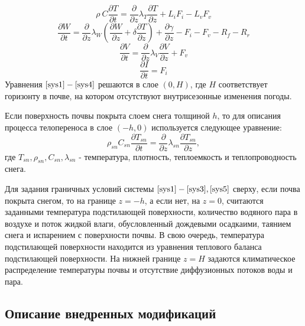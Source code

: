 \documentclass[a4paper, fontsize=14pt]{scrartcl}
\begin{document}
\begin{equation}
    \rho ~ C \dfrac{\partial T}{\partial t} = \dfrac{\partial }{\partial z} \lambda_T \dfrac{\partial T}{\partial z} + L_i F_i - L_v F_v  \label{sys1}
\end{equation}
\begin{equation}
    \dfrac{\partial W}{\partial t} = \dfrac{\partial }{\partial z} \lambda_W \left( \dfrac{\partial W}{\partial z} + \delta \dfrac{\partial T}{\partial z} \right) + \dfrac{\partial \gamma}{\partial z} - F_i - F_v - R_f - R_r  \label{sys2}
\end{equation}
\begin{equation}
    \dfrac{\partial V}{\partial t} = \dfrac{\partial }{\partial z} \lambda_V \dfrac{\partial V}{\partial z} + F_v  \label{sys3}
\end{equation}
\begin{equation}
    \dfrac{\partial I}{\partial t} = F_i  \label{sys4}
\end{equation}
Уравнения $\eqref{sys1} - \eqref{sys4}$ решаются в слое $(0, H)$, где $H$ соответствует горизонту в почве, на котором отсутствуют внутрисезонные изменения погоды.

Если поверхность почвы покрыта слоем снега толщиной $h$, то для описания процесса телопереноса в слое $(-h, 0)$ используется следующее уравнение:
\begin{equation}
    \rho_{sn} C_{sn} \dfrac{\partial T_{sn}}{\partial t} = \dfrac{\partial }{\partial z} \lambda_{sn} \dfrac{\partial T_{sn}}{\partial z},  \label{sys5}
\end{equation}
где $T_{sn}, \rho_{sn}, C_{sn}, \lambda_{sn}$ - температура, плотность, теплоемкость и теплопроводность снега.

Для задания граничных условий системы $\eqref{sys1} - \eqref{sys3}, \eqref{sys5}$ сверху, если почва покрыта снегом, то на границе $z = -h$, а если нет, на $z = 0$, считаются заданными температура подстилающей поверхности, количество водяного пара в воздухе и поток жидкой влаги, обусловленный дождевыми осадкаими, таянием снега и испарением с поверхности почвы. В свою очередь, температура подстилающей поверхности находится из уравнения теплового баланса подстилающей поверхности. На нижней границе $z = H$ задаются климатическое распределение температуры почвы и отсутствие диффузионных потоков воды и пара. 

\subsection{Описание внедренных модификаций}
\end{document}
